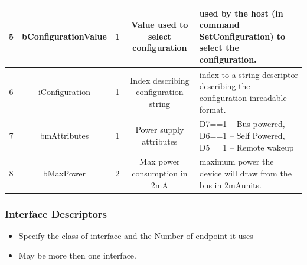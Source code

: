 \documentclass{article}
\begin{document}
\begin{table}[H]
\begin{adjustbox}{max width=\textwidth}
\begin{tabular}{|c|c|c|c|p{6cm}|}
            \hline
            5                          & bConfigurationValue & 1                        & Value used to select configuration    & used by the host (in command SetConfiguration) to select the configuration.                                                            \\
            \hline
            6                          & iConfiguration      & 1                        & Index describing configuration string & index to a string descriptor describing the configuration inreadable format.                                                           \\
            \hline
            7                          & bmAttributes        & 1                        & Power supply attributes               & D7==1 -- Bus-powered, D6==1 -- Self Powered, D5==1 -- Remote wakeup                                                                    \\
            \hline
            8                          & bMaxPower           & 2                        & Max power consumption in 2mA          & maximum power the device will draw from the bus in 2mAunits.                                                                           \\
            \hline
        \end{tabular}
    \end{adjustbox}
\end{table}

\subsubsection{Interface Descriptors}
\begin{itemize}
    \item Specify the class of interface and the Number of endpoint it uses
    \item May be more then one interface.
\end{itemize}
\end{document}
